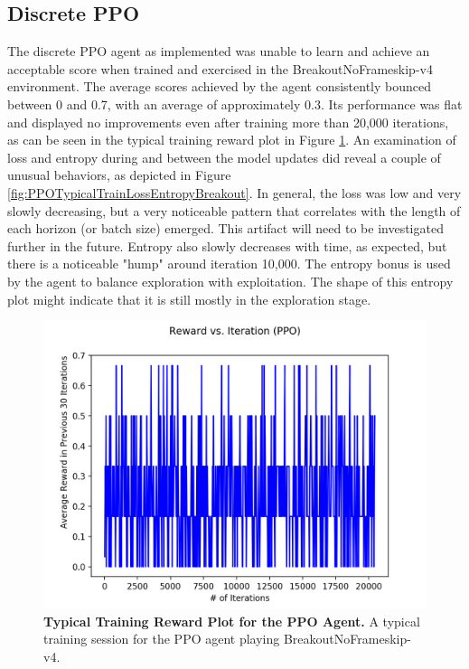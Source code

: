 \documentclass[conference]{IEEEtran}
\begin{document}
\subsection{Discrete PPO}
The discrete PPO agent as implemented was unable to learn and achieve an acceptable score when trained and exercised in the BreakoutNoFrameskip-v4 environment. The average scores achieved by the agent consistently bounced between 0 and 0.7, with an average of approximately 0.3. Its performance was flat and displayed no improvements even after training more than 20,000 iterations, as can be seen in the typical training reward plot in Figure \ref{fig:PPOTypicalTrainRewardBreakout}. An examination of loss and entropy during and between the model updates did reveal a couple of unusual behaviors, as depicted in Figure \ref{fig:PPOTypicalTrainLossEntropyBreakout}. In general, the loss was low and very slowly decreasing, but a very noticeable pattern that correlates with the length of each horizon (or batch size) emerged. This artifact will need to be investigated further in the future. Entropy also slowly decreases with time, as expected, but there is a noticeable "hump" around iteration 10,000. The entropy bonus is used by the agent to balance exploration with exploitation. The shape of this entropy plot might indicate that it is still mostly in the exploration stage.

\begin{figure}[htbp]
\centerline{\includegraphics[scale=0.5]{PPO_Train_Reward_Plot_Breakout_Typical.png}}
\caption{\textbf{Typical Training Reward Plot for the PPO Agent.}  A typical training session for the PPO agent playing BreakoutNoFrameskip-v4.}
\label{fig:PPOTypicalTrainRewardBreakout}
\end{figure}
\end{document}
